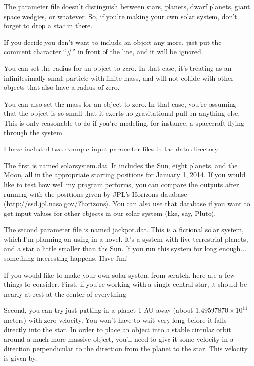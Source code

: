 \documentclass{article}
\begin{document}
The parameter file doesn't distinguish between stars, planets, dwarf planets, giant space wedgies, or whatever.  So, if you're making your own solar system, don't forget to drop a star in there.

If you decide you don't want to include an object any more, just put the comment character ``\#'' in front of the line, and it will be ignored.

You can set the radius for an object to zero.  In that case, it's treating as an infinitesimally small particle with finite mass, and will not collide with other objects that also have a radius of zero.

You can also set the mass for an object to zero.  In that case, you're assuming that the object is so small that it exerts no gravitational pull on anything else.  This is only reasonable to do if you're modeling, for instance, a spacecraft flying through the system.

I have included two example input parameter files in the data directory.

The first is named solarsystem.dat.  It includes the Sun, eight planets, and the Moon, all in the appropriate starting positions for January 1, 2014.  If you would like to test how well my program performs, you can compare the outputs after running with the positions given by JPL's Horizons database (\url{http://ssd.jpl.nasa.gov/?horizons}).  You can also use that database if you want to get input values for other objects in our solar system (like, say, Pluto).

The second parameter file is named jackpot.dat.  This is a fictional solar system, which I'm planning on using in a novel.  It's a system with five terrestrial planets, and a star a little smaller than the Sun.  If you run this system for long enough... something interesting happens.  Have fun!

If you would like to make your own solar system from scratch, here are a few things to consider.  First, if you're working with a single central star, it should be nearly at rest at the center of everything.

Second, you can try just putting in a planet 1 AU away (about $1.49597870\times10^{11}$ meters) with zero velocity.  You won't have to wait very long before it falls directly into the star.  In order to place an object into a stable circular orbit around a much more massive object, you'll need to give it some velocity in a direction perpendicular to the direction from the planet to the star.  This velocity is given by:
\end{document}
